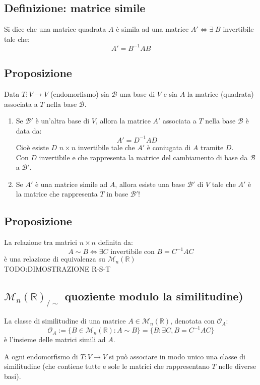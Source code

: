 \subsection{Definizione: matrice simile}
Si dice che una matrice quadrata $A$ è simila ad una matrice $A'\Leftrightarrow\exists\; B$ invertibile tale che:
\[A'=B^{-1}AB\]

\subsection{Proposizione}
Data $T:V\rightarrow V$ (endomorfismo) sia $\mathcal{B}$ una base di $V$ e sia $A$ la matrice (quadrata) associata a $T$ nella base $\mathcal{B}$.
\begin{enumerate}
\item Se $\mathcal{B}'$ è un'altra base di $V$, allora la matrice $A'$ associata a $T$ nella base $\mathcal{B}$ è data da:
  \[A'=D^{-1}AD\]
  Cioè esiste $D$ $n\times n$ invertibile tale che $A'$ è coniugata di $A$ tramite $D$.
  \\Con $D$ invertibile e che rappresenta la matrice del cambiamento di base da $\mathcal{B}$ a $\mathcal{B}'$.

\item Se $A'$ è una matrice simile ad $A$, allora esiste una base $\mathcal{B}'$ di $V$ tale che $A'$ è la matrice che rappresenta $T$ in base $\mathcal{B}'$!

\end{enumerate}

\subsection{Proposizione}
La relazione tra matrici $n\times n$ definita da:
\[A\sim B\Leftrightarrow\exists C\text{ invertibile con } B=C^{-1}AC\]
è una relazione di equivalenza su $\mathcal{M}_n(\mathbb{R})$
\\TODO:DIMOSTRAZIONE R-S-T

\subsection{$\mathcal{M}_n(\mathbb{R})_{/\sim}$ quoziente modulo la similitudine)}
La classe di similitudine di una matrice $A\in \mathcal{M}_n(\mathbb{R})$, denotata con $\mathcal{O}_A$:
\[\mathcal{O}_A:=\{B\in\mathcal{M}_n(\mathbb{R}): A\sim B\}=\{B:\exists C, B=C^{-1}AC\}\]
è l'insieme delle matrici simili ad $A$.

A ogni endomorfismo di $T:V\rightarrow V$ si può associare in modo unico una classe di similitudine (che contiene tutte e sole le matrici che rappresentano $T$ nelle diverse basi).

